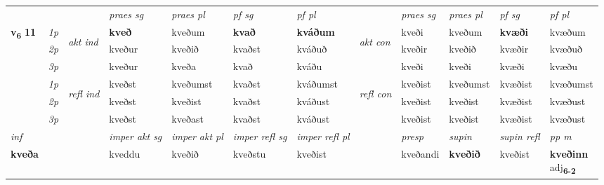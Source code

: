 \begin{longtable}[l]{X>{\footnotesize\itshape}llXXXXlXXXX}
 & &   & \textit{praes sg}  & \textit{praes pl}    & \textit{ pf sg} & \textit{pf pl} & & \textit{praes sg}  & \textit{praes pl}    & \textit{pf sg} & \textit{pf pl }  \\ \cmidrule{4-7} \cmidrule{9-12}
 \multirow{2}{*}{{{\textbf{v{\textsubscript{6}}} \Large{\textbf{11}}}}}  & 1p & \multirow{3}{*}{\begin{turn}{90}\textit{akt ind}\end{turn}} & \textbf{kveð} & kveðum & \textbf{kvað} & \textbf{kváðum} & \multirow{3}{*}{\begin{turn}{90}\textit{akt con}\end{turn}} &kveði & kveðum & \textbf{kvæði} & kvæðum\\*
 & 2p &  &  kveður  & kveðið & kvaðst & kváðuð & & kveðir & kveðið & kvæðir & kvæðuð \\*
 & 3p &  & kveður & kveða & kvað & kváðu & & kveði & kveði& kvæði & kvæðu \\*
\cmidrule{4-7} \cmidrule{9-12}
 & 1p & \multirow{3}{*}{\begin{turn}{90}\textit{refl ind}\end{turn}}  & kveðst & kveðumst & kvaðst & kváðumst & \multirow{3}{*}{\begin{turn}{90}\textit{refl con}\end{turn}}  &kveðist & kveðumst & kvæðist & kvæðumst \\*
 & 2p &  & kveðst & kveðist & kvaðst & kváðust & &kveðist & kveðist & kvæðist & kvæðust \\*
 & 3p  & & kveðst & kveðast & kvaðst & kváðust & & kveðist & kveðist& kvæðist & kvæðust \\*
\cmidrule{4-7} \cmidrule{9-12}

   {\textit{inf}} & &  & \textit{imper akt sg} & \textit{imper akt pl} & \textit{imper refl sg} & \textit{imper refl pl} && \textit{presp} & \textit{supin} & \textit{supin refl} & \textit{pp m} \\*
  {\textbf{kveða}} & && kveddu  & kveðið & kveðstu & kveðist && kveðandi &  \textbf{kveðið} & kveðist & \specialcell{\textbf{kveðinn} \\ adj\textbf{\textsubscript{6-2}}} \\*

\midrule


\end{longtable}
